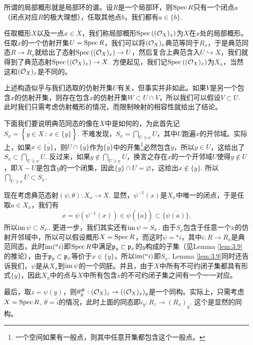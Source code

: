 \begin{para}[局部概形]
所谓的局部概形就是局部环的谱。设$R$是一个局部环，则$\operatorname{Spec} R$只有一个闭点$a$（闭点对应$R$的极大理想），任取其他点$b$，我们都有$a\in\overline{\{b\}}$.

任取概形$X$以及一点$x\in X$，我们称局部概形$\operatorname{Spec}\left((\mathcal{O}_{X})_x\right)$为$X$在$x$处的局部概形。任取$x$的一个仿射开集$U=\operatorname{Spec} R$，我们可以将$(\mathcal{O}_{X})_x$典范等同于$R_x$，于是典范同态$R\to R_x$就给出了态射$\operatorname{Spec}\left((\mathcal{O}_{X})_x\right)\to U$，然后复合上典范含入$U\hookrightarrow X$，我们就得到了典范态射$\operatorname{Spec}\left((\mathcal{O}_{X})_x\right)\to X$. 方便起见，我们记$\operatorname{Spec}\left((\mathcal{O}_{X})_x\right)$为$X_x$，当然这和$(\mathcal{O}_X)_x$是不同的。

上述构造似乎与我们选取的仿射开集$U$有关，但事实并非如此。如果$V$是另一个包含$x$的仿射开集，则存在包含$x$的仿射开集$W\subset U\cap V$，所以我们可以假设$V\subset U$. 此时我们只需考虑仿射概形的情况，而限制映射的相容性就给出了结论。

下面我们要说明典范同态的像在$X$中是如何的，为此首先记$S_x=\left\{y\in X\,:\, x\in \overline{\{y\}}\right\}$. 不难发现，$S_x=\bigcap_{U\ni x}U$，其中$U$跑遍$x$的开邻域。实际上，如果$x\in \overline{\{y\}}$，则$U\cap \overline{\{y\}}$作为$\overline{\{y\}}$中的开集\footnote{一个空间如果有一般点，则其中任意开集都包含这个一般点。}必然包含$y$，所以$y\in U$，这给出了$S_x\subset \bigcap_{U\ni x}U$. 反过来，如果$y\not\in \bigcap_{U\ni x}U$，换言之存在$x$的一个开邻域$U$使得$y\not\in U$，即$X-U$是包含$y$的一个闭集，因此$\overline{\{y\}}\cap U=\varnothing$，这给出$x\not\in \overline{\{y\}}$. 所以$\bigcap_{U\ni x}U\subset S_x$.

现在考虑典范态射$(\psi,\theta):X_x\to X$. 显然，$\psi^{-1}(x)$是$X_x$中唯一的闭点，于是任取$a\in X_x$，我们有
\[
	x=\psi(\psi^{-1}(x))\in \psi\left(\overline{\{a\}}\right)\subset \overline{\{\psi(a)\}}.
\]
所以$\operatorname{im} \psi\subset S_x$. 更进一步，我们其实还有$\operatorname{im} \psi=S_x$. 由于$S_x$包含于任意一个$x$的仿射开邻域中，所以可以假设概形$X=\operatorname{Spec} R$，而这时$\psi={}^a i$，其中$i:R\to R_x$是典范同态，此时$\operatorname{im}({}^a i)$即$\operatorname{Spec} R$中满足$\mathfrak{p}_y\subset \mathfrak{p}_x$的$y$构成的子集（见Lemma \ref{lem:3.9}的推论），由于$\mathfrak{p}_y\subset \mathfrak{p}_x$等价于$x\in \overline{\{y\}}$，所以$\operatorname{im}({}^a i)$即$S_x$. Lemma \ref{lem:3.9}同时还告诉我们，$\psi$是从$X_x$到$\operatorname{im}\psi$的一个同胚。并且，由于$X$中所有不可约闭子集都具有形式$\overline{\{y\}}$，因此$X_x$中的点与$X$中所有包含$x$的不可约闭子集之间有一个一一对应。

最后，取$z=\psi(y)$，则$\theta_y^\#:(\mathcal{O}_X)_z\to ((\mathcal{O}_X)_x)_y$是一个同构。实际上，只需考虑$X=\operatorname{Spec} R$, $\theta=\widetilde{i}$的情况，此时上面的同态即$i_y:R_z\to (R_x)_y$. 这个是显然的同构。
\end{para}

